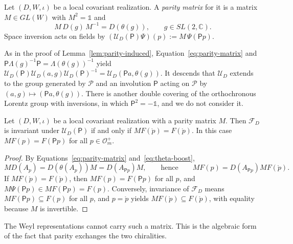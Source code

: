 	\begin{definition}\label{def:parity-realization}
		Let $(D,W,\iota)$ be a local covariant realization. A \emph{parity matrix} for it is a matrix $M\in GL(W)$ with $M^2=\mathbb{1}$ and
		\begin{equation}\label{eq:parity-matrix}
			M\,D(g)\,M^{-1}=D(\theta(g)), \qquad g\in SL(2,\mathbb{C}).
		\end{equation}
		Space inversion acts on fields by $(\mathcal{U}_D(\mathsf{P})\Psi)(p):=M\,\Psi(\mathsf{P}p)$.
	\end{definition}
	
	\noindent As in the proof of Lemma~\ref{lem:parity-induced}, Equation~\eqref{eq:parity-matrix} and $\mathsf{P}\Lambda(g)^{-1}\mathsf{P}=\Lambda(\theta(g))^{-1}$ yield $\mathcal{U}_D(\mathsf{P})\mathcal{U}_D(a,g)\mathcal{U}_D(\mathsf{P})^{-1}=\mathcal{U}_D(\mathsf{P}a,\theta(g))$. It descends that $\mathcal{U}_D$ extends to the group generated by $\mathcal{P}$ and an involution $\mathsf{P}$ acting on $\mathcal{P}$ by $(a,g)\mapsto(\mathsf{P}a,\theta(g))$. There is another double covering of the orthochronous Lorentz group with inversions, in which $\mathsf{P}^2=-\mathbb{1}$, and we do not consider it.
	
	\begin{lemma}\label{lem:parity-stable}
		Let $(D,W,\iota)$ be a local covariant realization with a parity matrix $M$. Then $\mathcal{F}_D$ is invariant under $\mathcal{U}_D(\mathsf{P})$ if and only if $M F(\mathring{p})=F(\mathring{p})$. In this case $M F(p)=F(\mathsf{P}p)$ for all $p\in\mathcal{O}_m^+$.
	\end{lemma}
	
	\begin{proof}
		By Equations~\eqref{eq:parity-matrix} and~\eqref{eq:theta-boost},
		\begin{equation*}
			MD(A_p)=D(\theta(A_p))M=D(A_{\mathsf{P}p})M, \qquad \text{hence}\qquad MF(p)=D(A_{\mathsf{P}p})MF(\mathring{p}).
		\end{equation*}
		If $MF(\mathring{p})=F(\mathring{p})$, then $MF(p)=F(\mathsf{P}p)$ for all $p$, and $M\Psi(\mathsf{P}p)\in MF(\mathsf{P}p)=F(p)$. Conversely, invariance of $\mathcal{F}_D$ means $MF(\mathsf{P}p)\subseteq F(p)$ for all $p$, and $p=\mathring{p}$ yields $MF(\mathring{p})\subseteq F(\mathring{p})$, with equality because $M$ is invertible.
	\end{proof}
	
	The Weyl representations cannot carry such a matrix. This is the algebraic form of the fact that parity exchanges the two chiralities.
	
